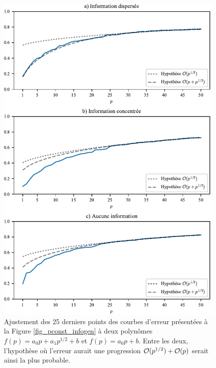 \begin{figure}[h!]
  \centering
  \includegraphics[width=1\textwidth]{../experiments/fig/pconst_infogen_cf.pdf}
  \caption[Ajustement des courbes d'erreurs de généralisation]{Ajustement des 25 derniers
    points des courbes d'erreur présentées à la Figure \ref{fig_pconst_infogen} à deux
    polynômes $f(p) = a_0p + a_1 p^{1/2} + b$ et $f(p) = a_0p + b$. Entre les deux,
    l'hypothèse où l'erreur aurait une progression $\mathcal O(p^{1/2}) + \mathcal O(p)$ serait
    ainsi la plus probable.}
  \label{fig_pconst_infogen_cf}
\end{figure}

\clearpage




